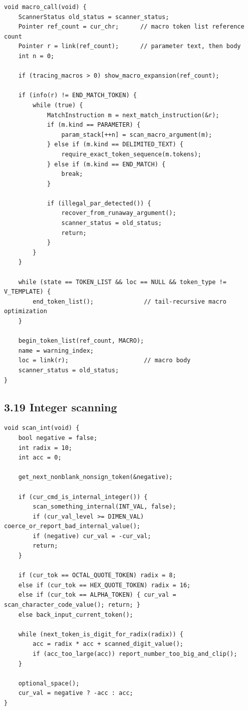 \documentclass[11pt]{article}
\begin{document}
\begin{verbatim}
void macro_call(void) {
    ScannerStatus old_status = scanner_status;
    Pointer ref_count = cur_chr;      // macro token list reference count
    Pointer r = link(ref_count);      // parameter text, then body
    int n = 0;

    if (tracing_macros > 0) show_macro_expansion(ref_count);

    if (info(r) != END_MATCH_TOKEN) {
        while (true) {
            MatchInstruction m = next_match_instruction(&r);
            if (m.kind == PARAMETER) {
                param_stack[++n] = scan_macro_argument(m);
            } else if (m.kind == DELIMITED_TEXT) {
                require_exact_token_sequence(m.tokens);
            } else if (m.kind == END_MATCH) {
                break;
            }

            if (illegal_par_detected()) {
                recover_from_runaway_argument();
                scanner_status = old_status;
                return;
            }
        }
    }

    while (state == TOKEN_LIST && loc == NULL && token_type != V_TEMPLATE) {
        end_token_list();              // tail-recursive macro optimization
    }

    begin_token_list(ref_count, MACRO);
    name = warning_index;
    loc = link(r);                     // macro body
    scanner_status = old_status;
}
\end{verbatim}

\subsection{3.19 Integer scanning}\label{integer-scanning}

\begin{verbatim}
void scan_int(void) {
    bool negative = false;
    int radix = 10;
    int acc = 0;

    get_next_nonblank_nonsign_token(&negative);

    if (cur_cmd_is_internal_integer()) {
        scan_something_internal(INT_VAL, false);
        if (cur_val_level >= DIMEN_VAL) coerce_or_report_bad_internal_value();
        if (negative) cur_val = -cur_val;
        return;
    }

    if (cur_tok == OCTAL_QUOTE_TOKEN) radix = 8;
    else if (cur_tok == HEX_QUOTE_TOKEN) radix = 16;
    else if (cur_tok == ALPHA_TOKEN) { cur_val = scan_character_code_value(); return; }
    else back_input_current_token();

    while (next_token_is_digit_for_radix(radix)) {
        acc = radix * acc + scanned_digit_value();
        if (acc_too_large(acc)) report_number_too_big_and_clip();
    }

    optional_space();
    cur_val = negative ? -acc : acc;
}
\end{verbatim}
\end{document}
